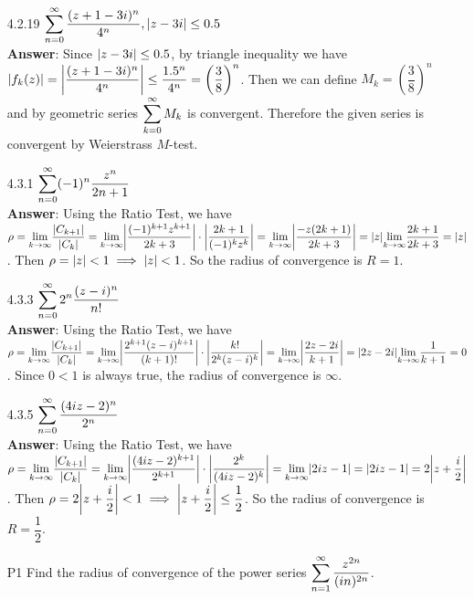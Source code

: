 \documentclass{article}
\begin{document}
\begin{itemize}
      \item [4.2.19] $\mathlarger{\sum_{n=0}^\infty\frac{(z+1-3i)^n}{4^n},\abs{z-3i}\leq 0.5}$\\
            \textbf{Answer}: Since $\abs{z-3i}\leq 0.5$, by triangle inequality we have $\abs{f_k(z)}=\abs{\dfrac{(z+1-3i)^n}{4^n}}\leq\dfrac{1.5^n}{4^n}=\left(\dfrac{3}{8}\right)^n$. Then we can define $M_k=\left(\dfrac{3}{8}\right)^n$ and by geometric series $\mathlarger{\sum_{k=0}^\infty M_k}$ is convergent. Therefore the given series is convergent by Weierstrass $M$-test.
      \item [4.3.1] $\mathlarger{\sum_{n=0}^\infty(-1)^n\frac{z^n}{2n+1}}$\\
            \textbf{Answer}: Using the Ratio Test, we have $\rho=\mathlarger{\lim_{k\rightarrow\infty}}\dfrac{\abs{C_{k+1}}}{\abs{C_k}}=\mathlarger{\lim_{k\rightarrow\infty}}\abs{\dfrac{(-1)^{k+1}z^{k+1}}{2k+3}}\cdot\abs{\dfrac{2k+1}{(-1)^kz^k}}=\mathlarger{\lim_{k\rightarrow\infty}}\abs{\dfrac{-z(2k+1)}{2k+3}}=\abs{z}\mathlarger{\lim_{k\rightarrow\infty}}\dfrac{2k+1}{2k+3}=\abs{z}$. Then $\rho=\abs{z}<1\implies\abs{z}<1$. So the radius of convergence is $R=1$.
      \item [4.3.3] $\mathlarger{\sum_{n=0}^\infty 2^n\dfrac{(z-i)^n}{n!}}$\\
            \textbf{Answer}: Using the Ratio Test, we have $\rho=\mathlarger{\lim_{k\rightarrow\infty}}\dfrac{\abs{C_{k+1}}}{\abs{C_k}}=\mathlarger{\lim_{k\rightarrow\infty}}\abs{\dfrac{2^{k+1}(z-i)^{k+1}}{(k+1)!}}\cdot\abs{\dfrac{k!}{2^k(z-i)^k}}=\mathlarger{\lim_{k\rightarrow\infty}}\abs{\dfrac{2z-2i}{k+1}}=\abs{2z-2i}\mathlarger{\lim_{k\rightarrow\infty}}\dfrac{1}{k+1}=0$. Since $0<1$ is always true, the radius of convergence is $\infty$.
      \item [4.3.5] $\mathlarger{\sum_{n=0}^\infty\frac{(4iz-2)^n}{2^n}}$\\
            \textbf{Answer}: Using the Ratio Test, we have $\rho=\mathlarger{\lim_{k\rightarrow\infty}}\dfrac{\abs{C_{k+1}}}{\abs{C_k}}=\mathlarger{\lim_{k\rightarrow\infty}}\abs{\dfrac{(4iz-2)^{k+1}}{2^{k+1}}}\cdot\abs{\dfrac{2^k}{(4iz-2)^k}}=\mathlarger{\lim_{k\rightarrow\infty}}\abs{2iz-1}=\abs{2iz-1}=2\abs{z+\dfrac{i}{2}}$. Then $\rho=2\abs{z+\dfrac{i}{2}}<1\implies\abs{z+\dfrac{i}{2}}\leq\dfrac{1}{2}$. So the radius of convergence is $R=\dfrac{1}{2}$.
      \item [P1] Find the radius of convergence of the power series $\mathlarger{\sum_{n=1}^\infty\frac{z^{2n}}{(in)^{2n}}}$.\\

\end{itemize}
\end{document}
